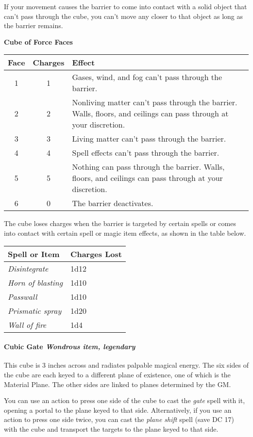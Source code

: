 \documentclass[
]{article}
\begin{document}
If your movement causes the barrier to come into contact with a solid
object that can't pass through the cube, you can't move any closer to
that object as long as the barrier remains.

\textbf{Cube of Force Faces}

\begin{longtable}[]{@{}ccl@{}}
\toprule
Face & Charges & Effect\tabularnewline
\midrule
\endhead
1 & 1 & Gases, wind, and fog can't pass through the
barrier.\tabularnewline
2 & 2 & Nonliving matter can't pass through the barrier. Walls, floors,
and ceilings can pass through at your discretion.\tabularnewline
3 & 3 & Living matter can't pass through the barrier.\tabularnewline
4 & 4 & Spell effects can't pass through the barrier.\tabularnewline
5 & 5 & Nothing can pass through the barrier. Walls, floors, and
ceilings can pass through at your discretion.\tabularnewline
6 & 0 & The barrier deactivates.\tabularnewline
\bottomrule
\end{longtable}

The cube loses charges when the barrier is targeted by certain spells or
comes into contact with certain spell or magic item effects, as shown in
the table below.

\begin{longtable}[]{@{}ll@{}}
\toprule
Spell or Item & Charges Lost\tabularnewline
\midrule
\endhead
\emph{Disintegrate} & 1d12\tabularnewline
\emph{Horn of blasting} & 1d10\tabularnewline
\emph{Passwall} & 1d10\tabularnewline
\emph{Prismatic spray} & 1d20\tabularnewline
\emph{Wall of fire} & 1d4\tabularnewline
\bottomrule
\end{longtable}

\hypertarget{cubic-gate-wondrous-item-legendary}{%
\paragraph{\texorpdfstring{Cubic Gate \emph{Wondrous item,
legendary}}{Cubic Gate Wondrous item, legendary}}\label{cubic-gate-wondrous-item-legendary}}

This cube is 3 inches across and radiates palpable magical energy. The
six sides of the cube are each keyed to a different plane of existence,
one of which is the Material Plane. The other sides are linked to planes
determined by the GM.

You can use an action to press one side of the cube to cast the
\emph{gate} spell with it, opening a portal to the plane keyed to that
side. Alternatively, if you use an action to press one side twice, you
can cast the \emph{plane shift} spell (save DC 17) with the cube and
transport the targets to the plane keyed to that side.
\end{document}
